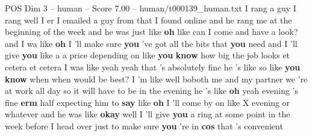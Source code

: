 \begin{textsample}{POS Dim 3 – human – Score 7.00 – human/t000139\_human.txt}  \label{ex:f3_pos_014}
I rang a guy I rang well I er I emailed a guy from that I found online and he rang me at the beginning of the week and he was just like \textbf{oh} like can I come and have a look? and I wa like \textbf{oh} I 'll make sure \textbf{you} 've got all the bits that \textbf{you} need and I 'll give \textbf{you} like a a price depending on like \textbf{you} \textbf{know} how big the job looks et cetera et cetera I was like yeah yeah that 's absolutely fine he 's like so like \textbf{you} \textbf{know} when when would be best?
I 'm like well boboth me and my partner we 're at work all day so it will have to be in the evening he 's like \textbf{oh} yeah evening 's fine \textbf{erm} half expecting him to \textbf{say} like \textbf{oh} I 'll come by on like X evening or whatever and he was like \textbf{okay} well I 'll give \textbf{you} a ring at some point in the week before I head over just to make sure \textbf{you} 're in \textbf{cos} that 's convenient

\end{textsample}
